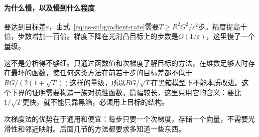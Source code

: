 \paragraph{为什么慢，以及慢到什么程度}
要达到目标差$\varepsilon$，由式~\eqref{eq:ns-subgradient-rate}需要$T\geq R^2G^2/\varepsilon^2$步。精度提高十倍，步数增加一百倍。梯度下降在光滑凸目标上的步数是$O(1/\varepsilon)$，这里慢了一个量级。

这不是分析得不够细。只通过函数值和次梯度了解目标的方法，在维数足够大时存在最坏的函数，使任何这类方法在前若干步的目标差都不低于$RG/(2(1+\sqrt{T}))$这样的量级，所以$RG/\sqrt{T}$在黑箱模型下不能本质改进。这个下界的证明需要构造一族对抗性函数，篇幅较长，这里只用它的含义：要比$1/\sqrt{T}$更快，就不能只靠黑箱，必须用上目标的结构。

次梯度法的优势在于通用和便宜：每步只要一个次梯度，存储一个向量，不需要光滑性和邻近映射。后面几节的方法都要求多知道一些东西。
